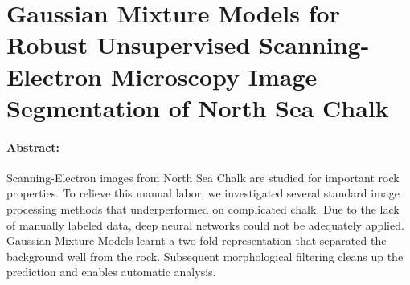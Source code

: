 \section[Gaussian Mixture Models for Robust Unsupervised Scanning-Electron Microscopy Image Segmentation of North Sea Chalk]{Gaussian Mixture Models for Robust Unsupervised Scanning-Electron Microscopy Image Segmentation of North Sea Chalk}

\paragraph{Abstract:} Scanning-Electron images from North Sea Chalk are studied for important rock properties. To relieve this manual labor, we investigated several standard image processing methods that underperformed on complicated chalk. Due to the lack of manually labeled data, deep neural networks could not be adequately applied. Gaussian Mixture Models learnt a two-fold representation that separated the background well from the rock. Subsequent morphological filtering cleans up the prediction and enables automatic analysis. 

{\vfill\hfill\newline{}}
